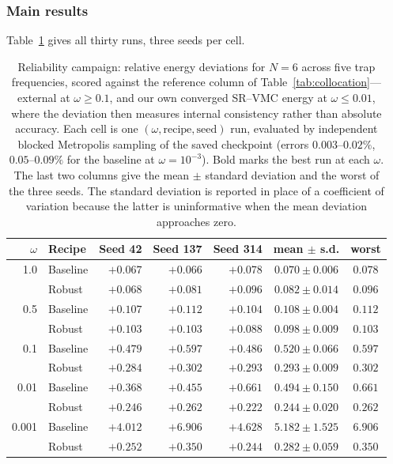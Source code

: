 \subsubsection{Main results}

Table~\ref{tab:reliability} gives all thirty runs, three seeds per cell.

\begin{table}[htbp]
  \centering
  \caption[Reliability campaign: 30 runs across five confinements]{Reliability campaign:
  relative energy deviations for $N{=}6$ across five trap frequencies, scored against the
  reference column of Table~\ref{tab:collocation}---external at $\omega\ge0.1$, and our own
  converged SR--VMC energy at $\omega\le0.01$, where the deviation then measures internal
  consistency rather than absolute accuracy. Each cell is one $(\omega,\text{recipe},\text{seed})$
  run, evaluated by independent blocked Metropolis sampling of the saved checkpoint (errors
  $0.003$--$0.02\%$, $0.05$--$0.09\%$ for the baseline at $\omega=10^{-3}$). Bold marks the best
  run at each $\omega$. The last two columns give the mean $\pm$ standard deviation and the
  worst of the three seeds. The standard deviation is reported in place of a coefficient of
  variation because the latter is uninformative when the mean deviation approaches zero.}
  \label{tab:reliability}
  \small
  \setlength{\tabcolsep}{4.5pt}
  \begin{tabular}{r l rrr cc}
    \toprule
    $\omega$ & Recipe & Seed 42 & Seed 137 & Seed 314 & mean $\pm$ s.d. & worst \\
    \midrule
    1.0 & Baseline & $+0.067$ & $\mathbf{+0.066}$ & $+0.078$ & $0.070\pm0.006$ & $0.078$ \\
     & Robust & $+0.068$ & $+0.081$ & $+0.096$ & $0.082\pm0.014$ & $0.096$ \\
    \midrule
    0.5 & Baseline & $+0.107$ & $+0.112$ & $+0.104$ & $0.108\pm0.004$ & $0.112$ \\
     & Robust & $+0.103$ & $+0.103$ & $\mathbf{+0.088}$ & $0.098\pm0.009$ & $0.103$ \\
    \midrule
    0.1 & Baseline & $+0.479$ & $+0.597$ & $+0.486$ & $0.520\pm0.066$ & $0.597$ \\
     & Robust & $\mathbf{+0.284}$ & $+0.302$ & $+0.293$ & $0.293\pm0.009$ & $0.302$ \\
    \midrule
    0.01 & Baseline & $+0.368$ & $+0.455$ & $+0.661$ & $0.494\pm0.150$ & $0.661$ \\
     & Robust & $+0.246$ & $+0.262$ & $\mathbf{+0.222}$ & $0.244\pm0.020$ & $0.262$ \\
    \midrule
    0.001 & Baseline & $+4.012$ & $+6.906$ & $+4.628$ & $5.182\pm1.525$ & $6.906$ \\
     & Robust & $+0.252$ & $+0.350$ & $\mathbf{+0.244}$ & $0.282\pm0.059$ & $0.350$ \\
    \bottomrule
  \end{tabular}
\end{table}

